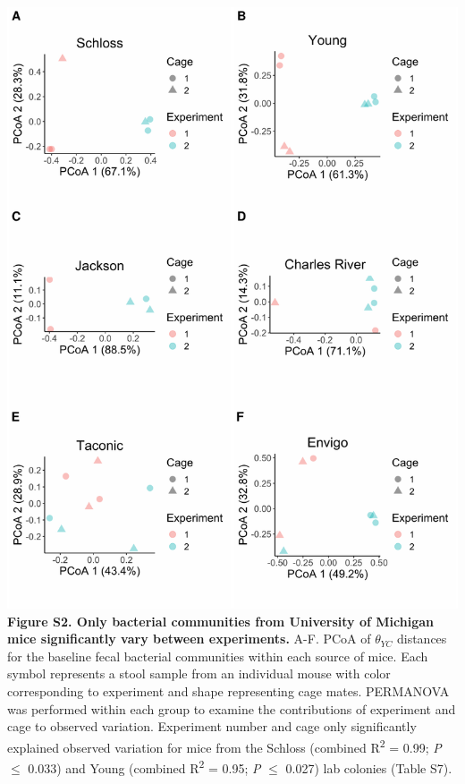 \documentclass[11pt,]{article}
\begin{document}
\includegraphics{figure_S2.pdf} \textbf{Figure S2. Only bacterial
communities from University of Michigan mice significantly vary between
experiments.} A-F. PCoA of \(\theta_{YC}\) distances for the baseline
fecal bacterial communities within each source of mice. Each symbol
represents a stool sample from an individual mouse with color
corresponding to experiment and shape representing cage mates. PERMANOVA
was performed within each group to examine the contributions of
experiment and cage to observed variation. Experiment number and cage
only significantly explained observed variation for mice from the
Schloss (combined R\textsuperscript{2} = 0.99; \emph{P} \(\le\) 0.033)
and Young (combined R\textsuperscript{2} = 0.95; \emph{P} \(\le\) 0.027)
lab colonies (Table S7).

\newpage
\end{document}
